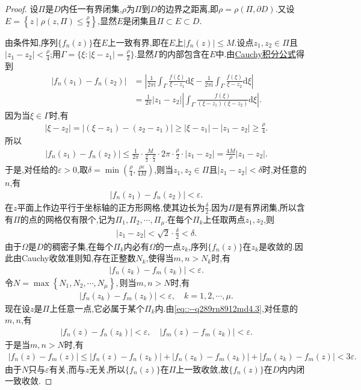 \documentclass[../../main.tex]{subfiles}%
\begin{document}
\begin{proof}
设$\Pi$是$D$内任一有界闭集,$\rho$为$\Pi$到$D$的边界之距离,即$\rho=\rho(\Pi,\partial D)$.又设$E=\left\{z\mid \rho(z,\Pi)\leqslant \frac{\rho}{2}\right\}$,显然$E$是闭集且$\Pi\subset E\subset D$.

由条件知,序列$\{f_n(z)\}$在$E$上一致有界,即在$E$上$|f_n(z)|\leqslant M$.设点$z_1,z_2\in \Pi$且$|z_1-z_2|<\frac{\rho}{4}$;用$\Gamma=\{\xi :|\xi-z_1|=\frac{\rho}{2}\}$.显然$\Gamma$的内部包含在$E$中.由\hyperref[theorem:复变-Cauchy积分公式]{Cauchy积分公式}得到
\begin{align*}
|f_n(z_1)-f_n(z_2)|&=\left| \frac{1}{2\pi\text{i}}\int_{\Gamma}\frac{f(\xi)}{\xi-z_1}\mathrm{d}\xi-\frac{1}{2\pi\text{i}}\int_{\Gamma}\frac{f(\xi)}{\xi-z_2}\mathrm{d}\xi \right| \\
&=\frac{1}{2\pi}|z_1-z_2|\left| \int_{\Gamma}\frac{f(\xi)}{(\xi-z_1)(\xi-z_2)}\mathrm{d}\xi \right|.
\end{align*}
因为当$\xi\in \Gamma$时,有
\begin{align*}
|\xi-z_2|=|(\xi-z_1)-(z_2-z_1)|\geqslant |\xi-z_1|-|z_1-z_2|\geqslant \frac{\rho}{4}.
\end{align*}
所以
\begin{align*}
|f_n(z_1)-f_n(z_2)|\leqslant \frac{1}{2\pi}\cdot \frac{M}{\frac{\rho}{2}\cdot \frac{\rho}{4}}\cdot 2\pi\cdot \frac{\rho}{2}\cdot |z_1-z_2| =\frac{4M}{\rho}|z_1-z_2|.
\end{align*}
于是,对任给的$\varepsilon>0$,取$\delta=\min\left( \frac{\rho}{4},\frac{\rho\varepsilon}{4M} \right)$,则当$z_1,z_2\in \Pi$且$|z_1-z_2|<\delta$时,对任意的$n$,有
\begin{align}
|f_n(z_1)-f_n(z_2)|<\varepsilon. \label{eq::--q289rn8912md4.3}
\end{align}
在$z$平面上作边平行于坐标轴的正方形网格,使其边长为$\frac{\delta}{2}$.因为$\Pi$是有界闭集,所以含有$\Pi$的点的网格仅有限个,记为$\Pi_1,\Pi_2,\cdots,\Pi_{\mu}$.在每个$\Pi_k$上任取两点$z_1,z_2$,则
\begin{align*}
|z_1-z_2|<\sqrt{2}\cdot \frac{\delta}{2}<\delta.
\end{align*}
由于$\Omega$是$D$的稠密子集,在每个$\Pi_k$内必有$\Omega$的一点$z_k$,序列$\{f_n(z)\}$在$z_k$是收敛的.因此由Cauchy收敛准则知,存在正整数$N_k$,使得当$m,n>N_k$时,有
\begin{align*}
|f_n(z_k)-f_m(z_k)|<\varepsilon.
\end{align*}
令$N=\max \left\{ N_1,N_2,\cdots ,N_{\mu} \right\} ,$则当$m,n>N$时,有
\begin{align*}
|f_n(z_k)-f_m(z_k)|<\varepsilon,\quad k=1,2,\cdots,\mu.
\end{align*}
现在设$z$是$\Pi$上任意一点,它必属于某个$\Pi_k$内.由\eqref{eq::--q289rn8912md4.3},对任意的$m,n$,有
\begin{align*}
|f_n(z)-f_n(z_k)|<\varepsilon, \quad |f_m(z)-f_m(z_k)|<\varepsilon.
\end{align*}
于是当$m,n>N$时,有
\begin{align*}
|f_n(z)-f_m(z)|\leqslant |f_n(z)-f_n(z_k)|+|f_n(z_k)-f_m(z_k)|+ |f_m(z_k)-f_m(z)|<3\varepsilon.
\end{align*}
由于$N$只与$\varepsilon$有关,而与$z$无关,所以$\{f_n(z)\}$在$\Pi$上一致收敛,故$\{f_n(z)\}$在$D$内内闭一致收敛.
\end{proof}
\end{document}
